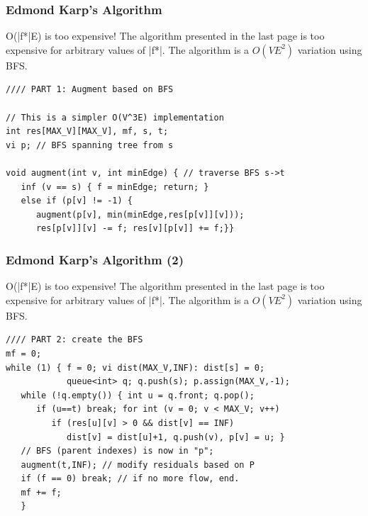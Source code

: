 \documentclass{beamer}
\begin{document}
\begin{frame}
  \frametitle{Edmond Karp's Algorithm}

  {\smaller
  \begin{block}{O(|f*|E) is too expensive!}
    The algorithm presented in the last page is too expensive for
    arbitrary values of |f*|. The  algorithm is 
    a $O(VE^2)$ variation using BFS.
  \end{block}

\begin{verbatim}
//// PART 1: Augment based on BFS

// This is a simpler O(V^3E) implementation
int res[MAX_V][MAX_V], mf, s, t;
vi p; // BFS spanning tree from s

void augment(int v, int minEdge) { // traverse BFS s->t
   inf (v == s) { f = minEdge; return; }
   else if (p[v] != -1) { 
      augment(p[v], min(minEdge,res[p[v]][v]));
      res[p[v]][v] -= f; res[v][p[v]] += f;}}
\end{verbatim}
}
\end{frame}

\begin{frame}
  \frametitle{Edmond Karp's Algorithm (2)}
  {\smaller
  \begin{block}{O(|f*|E) is too expensive!}
    The algorithm presented in the last page is too expensive for
    arbitrary values of |f*|. The  algorithm is 
    a $O(VE^2)$ variation using BFS.
  \end{block}

\begin{verbatim}
//// PART 2: create the BFS
mf = 0;
while (1) { f = 0; vi dist(MAX_V,INF): dist[s] = 0;
            queue<int> q; q.push(s); p.assign(MAX_V,-1);
   while (!q.empty()) { int u = q.front; q.pop();
      if (u==t) break; for int (v = 0; v < MAX_V; v++)
         if (res[u][v] > 0 && dist[v] == INF)
            dist[v] = dist[u]+1, q.push(v), p[v] = u; }
   // BFS (parent indexes) is now in "p";
   augment(t,INF); // modify residuals based on P
   if (f == 0) break; // if no more flow, end.
   mf += f;
   }
\end{verbatim}
  }
\end{frame}
\end{document}
